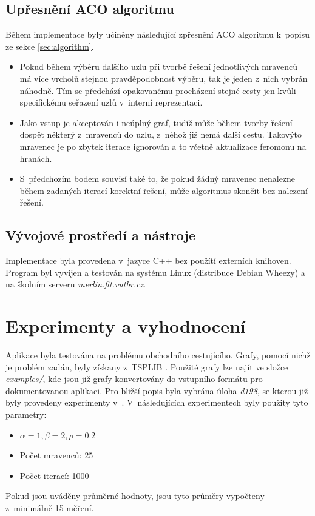 \documentclass[a4paper, 12pt]{article}
\begin{document}
\subsection{Upřesnění ACO algoritmu}
Během implementace byly učiněny následující zpřesnění ACO algoritmu k~popisu ze sekce \ref{sec:algorithm}.
\begin{itemize}
  \item Pokud během výběru dalšího uzlu při tvorbě řešení jednotlivých mravenců má více vrcholů stejnou pravděpodobnost výběru, tak je jeden z~nich vybrán náhodně.
  Tím se předchází opakovanému procházení stejné cesty jen kvůli specifickému seřazení uzlů v~interní reprezentaci.
  \item Jako vstup je akceptován i neúplný graf, tudíž může během tvorby řešení dospět některý z~mravenců do uzlu, z~něhož již nemá další cestu. Takovýto mravenec
  je po zbytek iterace ignorován a to včetně aktualizace feromonu na hranách.
  \item S~předchozím bodem souvisí také to, že pokud žádný mravenec nenalezne během zadaných iterací korektní řešení, může algoritmus skončit bez nalezení
  řešení.
\end{itemize}

\subsection{Vývojové prostředí a nástroje}
Implementace byla provedena v~jazyce C++ bez použítí externích knihoven. Program byl vyvíjen a testován na systému Linux (distribuce Debian Wheezy) a na školním
serveru \emph{merlin.fit.vutbr.cz}.

\section{Experimenty a vyhodnocení}
\label{sec:eval}
Aplikace byla testována na problému obchodního cestujícího. Grafy, pomocí nichž je problém zadán, byly získany z~TSPLIB \cite{TSPLIB}.
Použité grafy lze najít ve složce \emph{examples/}, kde jsou již grafy konvertovány do vstupního formátu pro dokumentovanou aplikaci. Pro bližší popis
byla vybrána úloha \emph{d198}, se kterou již byly provedeny experimenty v~\cite{aco:maxmintsp,aco:acs}. V~následujících experimentech byly použity tyto
parametry:
  \begin{itemize}
    \item $\alpha=1, \beta=2, \rho=0.2$
    \item Počet mravenců: 25
    \item Počet iterací: 1000
  \end{itemize}
Pokud jsou uváděny průměrné hodnoty, jsou tyto průměry vypočteny z~minimálně 15 měření.
\end{document}
